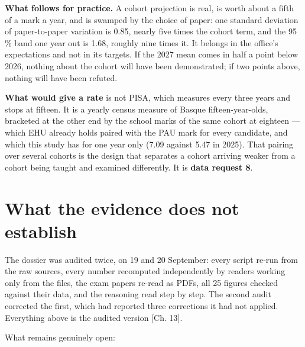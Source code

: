 \documentclass[
  10.5pt,
  a4paper,
  DIV=11,
  numbers=noendperiod]{scrartcl}
\begin{document}
\textbf{What follows for practice.} A cohort projection is real, is
worth about a fifth of a mark a year, and is swamped by the choice of
paper: one standard deviation of paper-to-paper variation is 0.85,
nearly five times the cohort term, and the 95 \% band one year out is
1.68, roughly nine times it. It belongs in the office's expectations and
not in its targets. If the 2027 mean comes in half a point below 2026,
nothing about the cohort will have been demonstrated; if two points
above, nothing will have been refuted.

\textbf{What would give a rate} is not PISA, which measures every three
years and stops at fifteen. It is a yearly census measure of Basque
fifteen-year-olds, bracketed at the other end by the school marks of the
same cohort at eighteen --- which EHU already holds paired with the PAU
mark for every candidate, and which this study has for one year only
(7.09 against 5.47 in 2025). That pairing over several cohorts is the
design that separates a cohort arriving weaker from a cohort being
taught and examined differently. It is \textbf{data request 8}.

\section{What the evidence does not
establish}\label{what-the-evidence-does-not-establish}

The dossier was audited twice, on 19 and 20 September: every script
re-run from the raw sources, every number recomputed independently by
readers working only from the files, the exam papers re-read as PDFs,
all 25 figures checked against their data, and the reasoning read step
by step. The second audit corrected the first, which had reported three
corrections it had not applied. Everything above is the audited version
{[}Ch. 13{]}.

What remains genuinely open:
\end{document}
